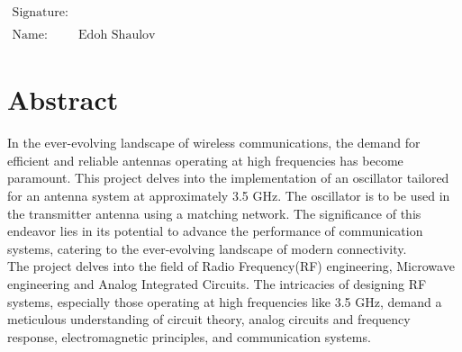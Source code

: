\documentclass[]{extarticle}
\begin{document}
\vspace{1cm} %
\begin{flushright}
    \(\begin{matrix}
    \text{Signature:} &  \\ \\
    \text{Name:} & \text{Edoh Shaulov} \\
\end{matrix}\)
\end{flushright}

\newpage

\tableofcontents

\newpage

\section{Abstract}

In the ever-evolving landscape of wireless communications, the demand for efficient and reliable antennas operating at high frequencies has become paramount. This project delves into the implementation of an oscillator tailored for an antenna system at approximately 3.5 GHz. The oscillator is to be used in the transmitter antenna using a matching network. The significance of this endeavor lies in its potential to advance the performance of communication systems, catering to the ever-evolving landscape of modern connectivity. \\


The project delves into the field of Radio Frequency(RF) engineering, Microwave engineering and Analog Integrated Circuits. The intricacies of designing RF systems, especially those operating at high frequencies like 3.5 GHz, demand a meticulous understanding of circuit theory, analog circuits and frequency response, electromagnetic principles, and communication systems. \\
\end{document}
